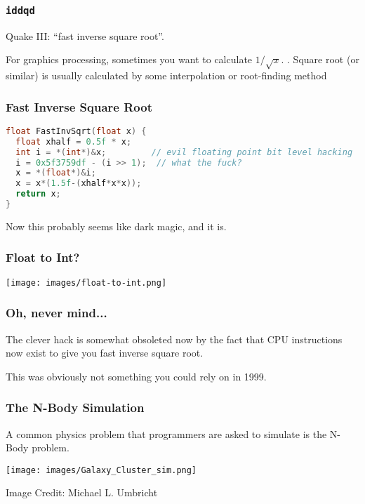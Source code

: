 \begin{frame}
\frametitle{\texttt{iddqd}}

Quake III: ``fast inverse square root''. 

For graphics processing, sometimes you want to calculate $1/\sqrt{x}$.
.
Square root (or similar) is usually calculated by some interpolation or root-finding method

\end{frame}


\begin{frame}[fragile]
\frametitle{Fast Inverse Square Root}

\begin{lstlisting}[language=C]
float FastInvSqrt(float x) {
  float xhalf = 0.5f * x;
  int i = *(int*)&x;         // evil floating point bit level hacking
  i = 0x5f3759df - (i >> 1);  // what the fuck?
  x = *(float*)&i;
  x = x*(1.5f-(xhalf*x*x));
  return x;
}
\end{lstlisting}

 Now this probably seems like dark magic, and it is. 

\end{frame}


\begin{frame}
\frametitle{Float to Int?}

\begin{center}
	\texttt{[image: images/float-to-int.png]}
\end{center}



\end{frame}



\begin{frame}
\frametitle{Oh, never mind...}


The clever hack is somewhat obsoleted now by the fact that CPU instructions now exist to give you fast inverse square root. 

This was obviously not something you could rely on in 1999.

\end{frame}




\begin{frame}
\frametitle{The N-Body Simulation}

A common physics problem that programmers are asked to simulate is the N-Body problem.

\begin{center}
\texttt{[image: images/Galaxy\_Cluster\_sim.png]}
\end{center}
\hfill Image Credit: Michael L. Umbricht 


\end{frame}


